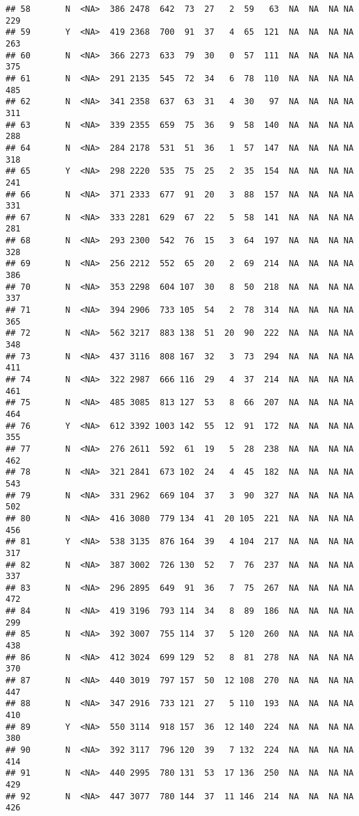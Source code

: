 \documentclass[]{article}
\begin{document}
\begin{verbatim}
## 58       N  <NA>  386 2478  642  73  27   2  59   63  NA  NA  NA NA  229
## 59       Y  <NA>  419 2368  700  91  37   4  65  121  NA  NA  NA NA  263
## 60       N  <NA>  366 2273  633  79  30   0  57  111  NA  NA  NA NA  375
## 61       N  <NA>  291 2135  545  72  34   6  78  110  NA  NA  NA NA  485
## 62       N  <NA>  341 2358  637  63  31   4  30   97  NA  NA  NA NA  311
## 63       N  <NA>  339 2355  659  75  36   9  58  140  NA  NA  NA NA  288
## 64       N  <NA>  284 2178  531  51  36   1  57  147  NA  NA  NA NA  318
## 65       Y  <NA>  298 2220  535  75  25   2  35  154  NA  NA  NA NA  241
## 66       N  <NA>  371 2333  677  91  20   3  88  157  NA  NA  NA NA  331
## 67       N  <NA>  333 2281  629  67  22   5  58  141  NA  NA  NA NA  281
## 68       N  <NA>  293 2300  542  76  15   3  64  197  NA  NA  NA NA  328
## 69       N  <NA>  256 2212  552  65  20   2  69  214  NA  NA  NA NA  386
## 70       N  <NA>  353 2298  604 107  30   8  50  218  NA  NA  NA NA  337
## 71       N  <NA>  394 2906  733 105  54   2  78  314  NA  NA  NA NA  365
## 72       N  <NA>  562 3217  883 138  51  20  90  222  NA  NA  NA NA  348
## 73       N  <NA>  437 3116  808 167  32   3  73  294  NA  NA  NA NA  411
## 74       N  <NA>  322 2987  666 116  29   4  37  214  NA  NA  NA NA  461
## 75       N  <NA>  485 3085  813 127  53   8  66  207  NA  NA  NA NA  464
## 76       Y  <NA>  612 3392 1003 142  55  12  91  172  NA  NA  NA NA  355
## 77       N  <NA>  276 2611  592  61  19   5  28  238  NA  NA  NA NA  462
## 78       N  <NA>  321 2841  673 102  24   4  45  182  NA  NA  NA NA  543
## 79       N  <NA>  331 2962  669 104  37   3  90  327  NA  NA  NA NA  502
## 80       N  <NA>  416 3080  779 134  41  20 105  221  NA  NA  NA NA  456
## 81       Y  <NA>  538 3135  876 164  39   4 104  217  NA  NA  NA NA  317
## 82       N  <NA>  387 3002  726 130  52   7  76  237  NA  NA  NA NA  337
## 83       N  <NA>  296 2895  649  91  36   7  75  267  NA  NA  NA NA  472
## 84       N  <NA>  419 3196  793 114  34   8  89  186  NA  NA  NA NA  299
## 85       N  <NA>  392 3007  755 114  37   5 120  260  NA  NA  NA NA  438
## 86       N  <NA>  412 3024  699 129  52   8  81  278  NA  NA  NA NA  370
## 87       N  <NA>  440 3019  797 157  50  12 108  270  NA  NA  NA NA  447
## 88       N  <NA>  347 2916  733 121  27   5 110  193  NA  NA  NA NA  410
## 89       Y  <NA>  550 3114  918 157  36  12 140  224  NA  NA  NA NA  380
## 90       N  <NA>  392 3117  796 120  39   7 132  224  NA  NA  NA NA  414
## 91       N  <NA>  440 2995  780 131  53  17 136  250  NA  NA  NA NA  429
## 92       N  <NA>  447 3077  780 144  37  11 146  214  NA  NA  NA NA  426

\end{verbatim}
\end{document}
